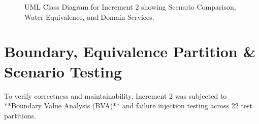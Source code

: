 \documentclass[12pt,a4paper]{article}
\begin{document}
\begin{figure}[htbp]
\caption{UML Class Diagram for Increment 2 showing Scenario Comparison, Water Equivalence, and Domain Services.}
\label{fig:uml-class}
\end{figure}

\section{Boundary, Equivalence Partition \& Scenario Testing}

To verify correctness and maintainability, Increment 2 was subjected to **Boundary Value Analysis (BVA)** and failure injection testing across 22 test partitions.
\end{document}
